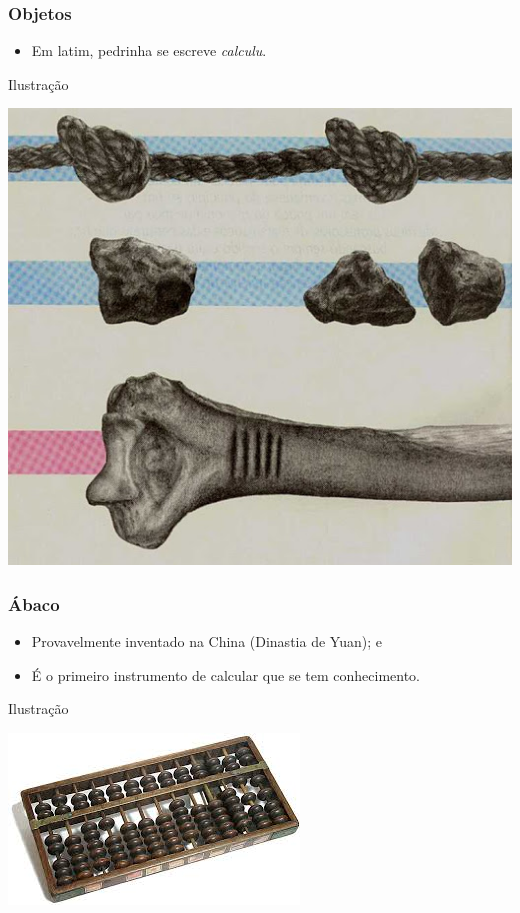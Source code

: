 \documentclass[aspectratio=169]{beamer} %
\begin{document}
\begin{frame}
	\frametitle{Objetos}
	
	\begin{itemize}
		\item Em latim, pedrinha se escreve \textit{calculu}.
	\end{itemize}\vfill
	
	\begin{exampleblock}{Ilustra\c cão}
		\begin{center}
			\includegraphics[scale=0.2]{img/objetos}
		\end{center}
	\end{exampleblock}
\end{frame}

\begin{frame}
	\frametitle{Ábaco}
	
	\begin{itemize}
		\item Provavelmente inventado na China (Dinastia de Yuan); e
		\item É o primeiro instrumento de calcular que se tem conhecimento.
	\end{itemize}\vfill
	
	\begin{exampleblock}{Ilustra\c cão}
		\begin{center}
			\includegraphics[scale=0.5]{img/abaco}
		\end{center}
	\end{exampleblock}
\end{frame}
\end{document}
